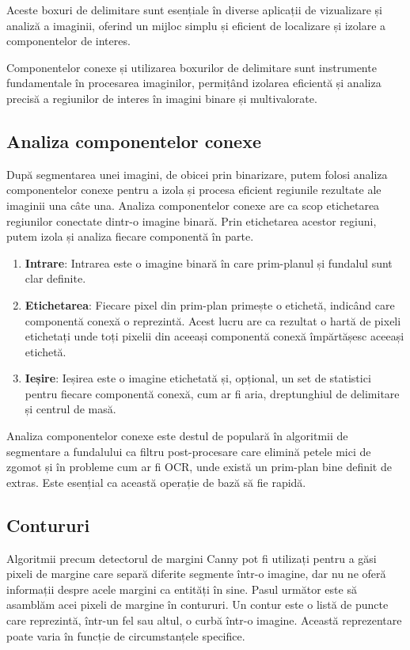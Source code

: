 Aceste boxuri de delimitare sunt esențiale în diverse aplicații de vizualizare și analiză a imaginii, oferind un mijloc simplu și eficient de localizare și izolare a componentelor de interes.

Componentelor conexe și utilizarea boxurilor de delimitare sunt instrumente fundamentale în procesarea imaginilor, permițând izolarea eficientă și analiza precisă a regiunilor de interes în imagini binare și multivalorate.

\subsection*{Analiza componentelor conexe}

După segmentarea unei imagini, de obicei prin binarizare, putem folosi analiza componentelor conexe pentru a izola și procesa eficient regiunile rezultate ale imaginii una câte una. Analiza componentelor conexe are ca scop etichetarea regiunilor conectate dintr-o imagine binară. Prin etichetarea acestor regiuni, putem izola și analiza fiecare componentă în parte.

\begin{enumerate}
    \item \textbf{Intrare}: Intrarea este o imagine binară în care prim-planul și fundalul sunt clar definite.
    \item \textbf{Etichetarea}: Fiecare pixel din prim-plan primește o etichetă, indicând care componentă conexă o reprezintă. Acest lucru are ca rezultat o hartă de pixeli etichetați unde toți pixelii din aceeași componentă conexă împărtășesc aceeași etichetă.
    \item \textbf{Ieșire}: Ieșirea este o imagine etichetată și, opțional, un set de statistici pentru fiecare componentă conexă, cum ar fi aria, dreptunghiul de delimitare și centrul de masă.
\end{enumerate}
Analiza componentelor conexe este destul de populară în algoritmii de segmentare a fundalului ca filtru post-procesare care elimină petele mici de zgomot și în probleme cum ar fi OCR, unde există un prim-plan bine definit de extras. Este esențial ca această operație de bază să fie rapidă.

\subsection*{Contururi}

Algoritmii precum detectorul de margini Canny pot fi utilizați pentru a găsi pixeli de margine care separă diferite segmente într-o imagine, dar nu ne oferă informații despre acele margini ca entități în sine. Pasul următor este să asamblăm acei pixeli de margine în contururi. Un contur este o listă de puncte care reprezintă, într-un fel sau altul, o curbă într-o imagine. Această reprezentare poate varia în funcție de circumstanțele specifice.

